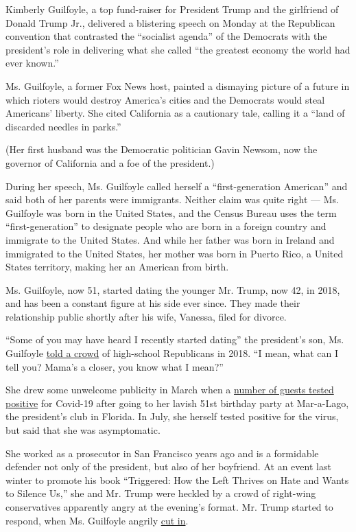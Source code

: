 Kimberly Guilfoyle, a top fund-raiser for President Trump and the
girlfriend of Donald Trump Jr., delivered a blistering speech on Monday
at the Republican convention that contrasted the ``socialist agenda'' of
the Democrats with the president's role in delivering what she called
``the greatest economy the world had ever known.''

Ms. Guilfoyle, a former Fox News host, painted a dismaying picture of a
future in which rioters would destroy America's cities and the Democrats
would steal Americans' liberty. She cited California as a cautionary
tale, calling it a ``land of discarded needles in parks.''

(Her first husband was the Democratic politician Gavin Newsom, now the
governor of California and a foe of the president.)

During her speech, Ms. Guilfoyle called herself a ``first-generation
American'' and said both of her parents were immigrants. Neither claim
was quite right --- Ms. Guilfoyle was born in the United States, and the
Census Bureau uses the term ``first-generation'' to designate people who
are born in a foreign country and immigrate to the United States. And
while her father was born in Ireland and immigrated to the United
States, her mother was born in Puerto Rico, a United States territory,
making her an American from birth.

Ms. Guilfoyle, now 51, started dating the younger Mr. Trump, now 42, in
2018, and has been a constant figure at his side ever since. They made
their relationship public shortly after his wife, Vanessa, filed for
divorce.

``Some of you may have heard I recently started dating'' the president's
son, Ms. Guilfoyle
\href{https://www.washingtonpost.com/lifestyle/style/kimberly-guilfoyle-was-once-compared-to-jackie-kennedy-now-shes-basically-a-trump/2018/08/22/eed842f0-9756-11e8-810c-5fa705927d54_story.html}{told
a crowd} of high-school Republicans in 2018. ``I mean, what can I tell
you? Mama's a closer, you know what I mean?''

She drew some unwelcome publicity in March when a
\href{https://www.nytimes3xbfgragh.onion/2020/03/14/us/politics/trump-coronavirus-mar-a-lago.html}{number
of guests tested positive} for Covid-19 after going to her lavish 51st
birthday party at Mar-a-Lago, the president's club in Florida. In July,
she herself tested positive for the virus, but said that she was
asymptomatic.

She worked as a prosecutor in San Francisco years ago and is a
formidable defender not only of the president, but also of her
boyfriend. At an event last winter to promote his book ``Triggered: How
the Left Thrives on Hate and Wants to Silence Us,'' she and Mr. Trump
were heckled by a crowd of right-wing conservatives apparently angry at
the evening's format. Mr. Trump started to respond, when Ms. Guilfoyle
angrily
\href{.\%20https:/www.washingtonpost.com/nation/2019/11/11/donald-trump-jr-book-talk-ucla-derailed-by-far-right-protesters}{cut
in}.

